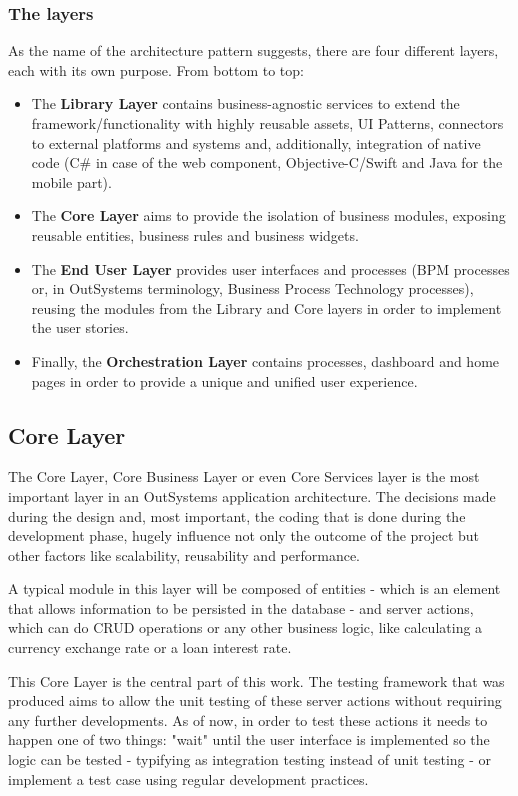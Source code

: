 \documentclass{sigchi}
\begin{document}
\subsubsection{The layers}
As the name of the architecture pattern suggests, there are four different layers, each with its own purpose. From bottom to top:
\begin{itemize}
    \item The \textbf{Library Layer} contains business-agnostic services to extend the framework/functionality with highly reusable assets, UI Patterns, connectors to external platforms and systems and, additionally, integration of native code (C\# in case of the web component, Objective-C/Swift and Java for the mobile part).
    \item The \textbf{Core Layer} aims to provide the isolation of business modules, exposing reusable entities, business rules and business widgets.
    \item The \textbf{End User Layer} provides user interfaces and processes (BPM processes or, in OutSystems terminology, Business Process Technology processes), reusing the modules from the Library and Core layers in order to implement the user stories.
    \item Finally, the \textbf{Orchestration Layer} contains processes, dashboard and home pages in order to provide a unique and unified user experience.
\end{itemize}

\subsection{Core Layer}
The Core Layer, Core Business Layer or even Core Services layer is the most important layer in an OutSystems application architecture. The decisions made during the design and, most important, the coding that is done during the development phase, hugely influence not only the outcome of the project but other factors like scalability, reusability and performance. 

A typical module in this layer will be composed of entities - which is an element that allows information to be persisted in the database - and server actions, which can do CRUD operations  or any other business logic, like calculating a currency exchange rate or a loan interest rate.

This Core Layer is the central part of this work. The testing framework that was produced aims to allow the unit testing of these server actions without requiring any further developments. As of now, in order to test these actions it needs to happen one of two things: "wait" until the user interface is implemented so the logic can be tested - typifying as integration testing instead of unit testing - or implement a test case using regular development practices.
\end{document}
